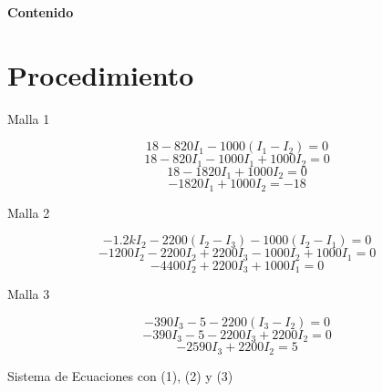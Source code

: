 \documentclass[a4paper, 11pt]{article}
\begin{document}
\textbf{}
\newpage

\begin{flushright}
\textbf{\Huge Contenido}
\end{flushright}

\renewcommand*\contentsname{}
{%
\tableofcontents
}



\newpage

\section{Procedimiento}

Malla 1

\begin{equation*}
18-820I_1-1000(I_1-I_2)=0
\end{equation*}
\begin{equation*}
18-820I_1-1000I_1+1000I_2=0
\end{equation*}
\begin{equation*}
18-1820I_1+1000I_2=0
\end{equation*}
\begin{equation*}
-1820I_1+1000I_2=-18
\end{equation*}

Malla 2

\begin{equation*}
 -1.2kI_2-2200(I_2-I_3)-1000(I_2-I_1)=0 
\end{equation*}
\begin{equation*}
 -1200I_2-2200I_2+2200I_3-1000I_2+1000I_1=0 
\end{equation*}
\begin{equation*}
 -4400I_2+2200I_3+1000I_1=0
\end{equation*}

Malla 3

\begin{equation*}
 -390I_3-5-2200(I_3-I_2)=0 
\end{equation*}
\begin{equation*}
 -390I_3-5-2200I_3+2200I_2=0
\end{equation*}
\begin{equation*}
 -2590I_3+2200I_2=5
\end{equation*}

Sistema de Ecuaciones con (1),  (2) y (3)
\end{document}
